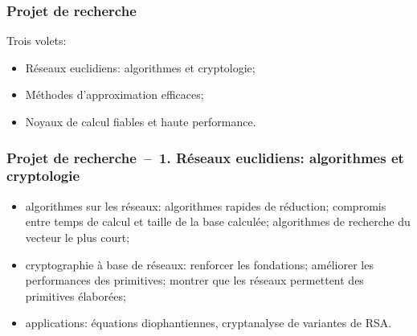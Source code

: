 \documentclass[mathsans]{beamer}
\begin{document}
\begin{frame}
\frametitle{Projet de recherche}
\begin{center}
\end{center}

\alert{Trois volets:}
\begin{itemize}
     \item Réseaux euclidiens: algorithmes et cryptologie;
     \item Méthodes d'approximation efficaces;
     \item Noyaux de calcul fiables et haute performance.
 \end{itemize}
\end{frame}



\begin{frame}
\frametitle{Projet de recherche~--~1. Réseaux euclidiens: algorithmes et cryptologie}
         \begin{itemize}
               \item \alert{algorithmes sur les réseaux:} algorithmes rapides de réduction; compromis entre temps de calcul et taille de la base calculée; algorithmes de recherche du vecteur le plus court;
               \item \alert{cryptographie à base de réseaux:} renforcer les fondations; améliorer les performances des primitives; montrer que les réseaux permettent des primitives élaborées;
               \item \alert{applications:} équations diophantiennes, cryptanalyse de variantes de RSA.
          \end{itemize}
\end{frame}
\end{document}
